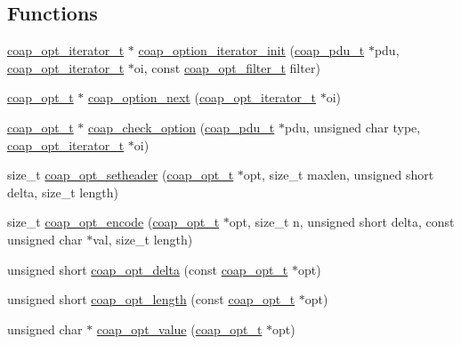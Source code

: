 \subsection*{Functions}
\begin{DoxyCompactItemize}
\item 
\hyperlink{structcoap__opt__iterator__t}{coap\+\_\+opt\+\_\+iterator\+\_\+t} $\ast$ \hyperlink{group__opt__filter_gacec8f143e7a4fe66d97f719f619d42b3}{coap\+\_\+option\+\_\+iterator\+\_\+init} (\hyperlink{structcoap__pdu__t}{coap\+\_\+pdu\+\_\+t} $\ast$pdu, \hyperlink{structcoap__opt__iterator__t}{coap\+\_\+opt\+\_\+iterator\+\_\+t} $\ast$oi, const \hyperlink{group__opt__filter_gace614f18a4f0133a72096094c11c3b19}{coap\+\_\+opt\+\_\+filter\+\_\+t} filter)
\item 
\hyperlink{option_8h_a351867e79474c96130f738fcfbc120cc}{coap\+\_\+opt\+\_\+t} $\ast$ \hyperlink{group__opt__filter_ga182fdeffe0b37e1ab0dc6ba8494abe4a}{coap\+\_\+option\+\_\+next} (\hyperlink{structcoap__opt__iterator__t}{coap\+\_\+opt\+\_\+iterator\+\_\+t} $\ast$oi)
\item 
\hyperlink{option_8h_a351867e79474c96130f738fcfbc120cc}{coap\+\_\+opt\+\_\+t} $\ast$ \hyperlink{group__opt__filter_gab2a1a3719d25b39377063c7cebac258d}{coap\+\_\+check\+\_\+option} (\hyperlink{structcoap__pdu__t}{coap\+\_\+pdu\+\_\+t} $\ast$pdu, unsigned char type, \hyperlink{structcoap__opt__iterator__t}{coap\+\_\+opt\+\_\+iterator\+\_\+t} $\ast$oi)
\item 
size\+\_\+t \hyperlink{group__opt__filter_ga6cc876020a0017266ffea98e949073dc}{coap\+\_\+opt\+\_\+setheader} (\hyperlink{option_8h_a351867e79474c96130f738fcfbc120cc}{coap\+\_\+opt\+\_\+t} $\ast$opt, size\+\_\+t maxlen, unsigned short delta, size\+\_\+t length)
\item 
size\+\_\+t \hyperlink{group__opt__filter_ga8b601ead68a35f2bcca8c101b0b93c23}{coap\+\_\+opt\+\_\+encode} (\hyperlink{option_8h_a351867e79474c96130f738fcfbc120cc}{coap\+\_\+opt\+\_\+t} $\ast$opt, size\+\_\+t n, unsigned short delta, const unsigned char $\ast$val, size\+\_\+t length)
\item 
unsigned short \hyperlink{group__opt__filter_gacec6795999a3ddaa56025a70abdc1d38}{coap\+\_\+opt\+\_\+delta} (const \hyperlink{option_8h_a351867e79474c96130f738fcfbc120cc}{coap\+\_\+opt\+\_\+t} $\ast$opt)
\item 
unsigned short \hyperlink{group__opt__filter_ga5616c72178d923fb02db863c87ee249f}{coap\+\_\+opt\+\_\+length} (const \hyperlink{option_8h_a351867e79474c96130f738fcfbc120cc}{coap\+\_\+opt\+\_\+t} $\ast$opt)
\item 
unsigned char $\ast$ \hyperlink{group__opt__filter_ga0f80e7bb12dca927fdf5829804c84b0e}{coap\+\_\+opt\+\_\+value} (\hyperlink{option_8h_a351867e79474c96130f738fcfbc120cc}{coap\+\_\+opt\+\_\+t} $\ast$opt)
\end{DoxyCompactItemize}


